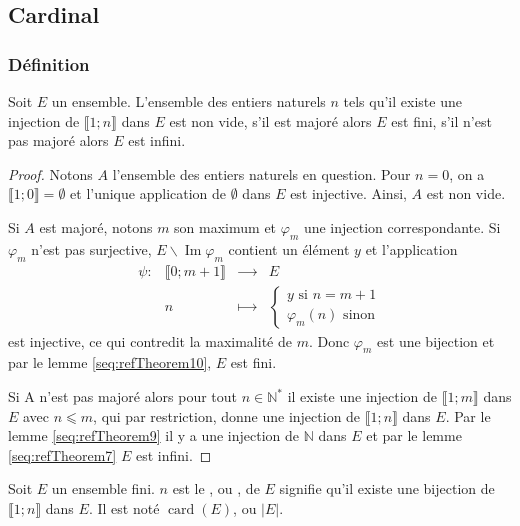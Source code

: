\subsection{Cardinal}
\subsubsection{Définition}
\begin{lemma}
Soit \(𝐸\) un ensemble. L'ensemble des entiers naturels \(𝑛\) tels qu'il existe une injection de \(⟦1;𝑛⟧\) dans
\(𝐸\) est non vide, s'il est majoré alors \(𝐸\) est fini, s'il n'est pas majoré alors \(𝐸\) est infini.
\end{lemma}
\begin{proof}
Notons \(𝐴\) l'ensemble des entiers naturels en question. Pour \(𝑛=0\), on a \(⟦1;0⟧=\mathsf{ ∅}\) et l'unique
application de \(\mathsf{ ∅}\) dans \(𝐸\) est injective. Ainsi, \(𝐴\) est non vide.

Si \(𝐴\) est majoré, notons \(𝑚\) son maximum et \(𝜑_𝑚\) une injection correspondante. Si \(𝜑_𝑚\) n'est pas
surjective, \(𝐸∖\operatorname{Im}𝜑_𝑚\) contient un élément \(𝑦\) et l'application
\begin{equation*}
\begin{matrix}
𝜓:&⟦0;𝑚+1⟧&⟶&𝐸
\\
&𝑛&⟼&\begin{cases}
𝑦\text{ si }𝑛=𝑚+1
\\
𝜑_𝑚(𝑛)\text{ sinon}
\end{cases}
\end{matrix}
\end{equation*}
est injective, ce qui contredit la maximalité de \(𝑚\). Donc \(𝜑_𝑚\) est une bijection et par le lemme
\ref{seq:refTheorem10}, \(𝐸\) est fini.

Si A n'est pas majoré alors pour tout \(𝑛∈ℕ^{ *}\) il existe une injection de \(⟦1;𝑚⟧\) dans \(𝐸\) avec
\(𝑛⩽𝑚\), qui par restriction, donne une injection de \(⟦1;𝑛⟧\) dans \(𝐸\). Par le lemme \ref{seq:refTheorem9} il y
a une injection de \(ℕ\) dans \(𝐸\) et par le lemme \ref{seq:refTheorem7} \(𝐸\) est infini.
\end{proof}
\begin{definition}
Soit \(𝐸\) un ensemble fini. \(𝑛\) est le , ou , de \(𝐸\) signifie
qu'il existe une bijection de \(⟦1;𝑛⟧\) dans \(𝐸\). Il est noté \(\operatorname{card}(𝐸)\), ou \(|𝐸|\).
\end{definition}
